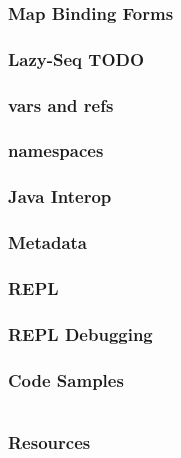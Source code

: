 \documentclass{beamer}
\begin{document}
\begin{frame}
  \frametitle{Map Binding Forms}
\end{frame}

\begin{frame}
  \frametitle{Lazy-Seq TODO}
\end{frame}

\begin{frame}
  \frametitle{vars and refs}
  
\end{frame}

\begin{frame}
  \frametitle{namespaces}
\end{frame}

\begin{frame}
  \frametitle{Java Interop}
  
\end{frame}

\begin{frame}
  \frametitle{Metadata}

\end{frame}

\begin{frame}
  \frametitle{REPL}

\end{frame}

\begin{frame}
  \frametitle{REPL Debugging}

\end{frame}

\begin{frame}
  \frametitle{Code Samples} 
  \inputminted{clojure}{src/xml-parse.clj}
\end{frame}  

\begin{frame}
  \frametitle{Resources}
\end{frame}

% 
% 
\end{document}
